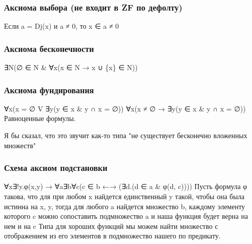 \documentclass[11pt]{article}
\begin{document}
\subsubsection{Аксиома выбора (не входит в ZF по дефолту)}
\label{sec-2-40-6}
Если a = Dj(x) и a ≠ 0, то x ∈ a ≠ 0
\subsubsection{Аксиома бесконечности}
\label{sec-2-40-7}
∃N(∅ ∈ N \& ∀x(x ∈ N → x ∪ \{x\} ∈ N))
\subsubsection{Аксиома фундирования}
\label{sec-2-40-8}
∀x(x = ∅ V ∃y(y ∈ x \& y ∩ x = ∅))
∀x(x ≠ ∅ → ∃y(y ∈ x \& y ∩ x = ∅))
Равноценные формулы.

Я бы сказал, что это звучит как-то типа
"не существует бесконечно вложенных множеств"
\subsubsection{Схема аксиом подстановки}
\label{sec-2-40-9}
∀x∃!y.φ(x,y) → ∀a∃b∀c(c ∈ b ←→ (∃d.(d ∈ a \& φ(d, c))))
Пусть формула φ такова, что для при любом x найдется единственный y
такой, чтобы она была истинна на x, y, тогда для любого a
найдется множество b, каждому элементу которого c можно сопоставить
подмножество a и наша функция будет верна на нем и на c
Типа для хороших функций мы можем найти множество с отображением из
его элементов в подмножество нашего по предикату.
\end{document}
